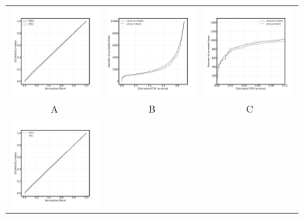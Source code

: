 \documentclass{article}
\begin{document}
\begin{figure}
	\centering
	\begin{tabular}{ccc}
 		\includegraphics[width=2in]{img/QQ_with_labels.png} &
		\includegraphics[width=2in]{img/test_pred_with_labels.png} & 
            \includegraphics[width=2in]
            {img/test_pred_with_labels_loc.png}
		\\
		A & B & C\\
            \includegraphics[width=2in]{img/QQ_no_labels.png} &

\end{tabular}
\end{figure}
\end{document}
